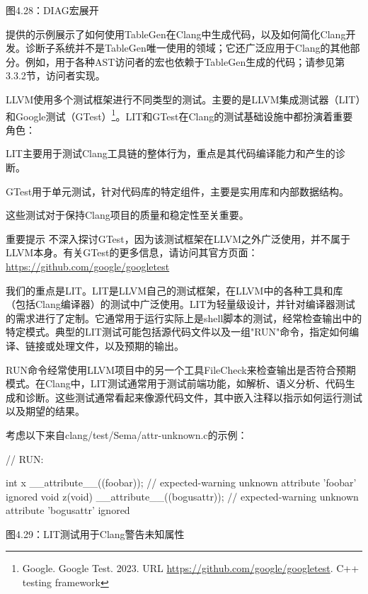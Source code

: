 \begin{center}
图4.28：DIAG宏展开
\end{center}

提供的示例展示了如何使用TableGen在Clang中生成代码，以及如何简化Clang开发。诊断子系统并不是TableGen唯一使用的领域；它还广泛应用于Clang的其他部分。例如，用于各种AST访问者的宏也依赖于TableGen生成的代码；请参见第3.3.2节，访问者实现。


LLVM使用多个测试框架进行不同类型的测试。主要的是LLVM集成测试器（LIT）和Google测试（GTest）\footnote{Google. Google Test. 2023. URL \url{https://github.com/google/googletest}. C++ testing framework}。LIT和GTest在Clang的测试基础设施中都扮演着重要角色：

LIT主要用于测试Clang工具链的整体行为，重点是其代码编译能力和产生的诊断。

GTest用于单元测试，针对代码库的特定组件，主要是实用库和内部数据结构。

这些测试对于保持Clang项目的质量和稳定性至关重要。

\begin{myNotic}{重要提示}
不深入探讨GTest，因为该测试框架在LLVM之外广泛使用，并不属于LLVM本身。有关GTest的更多信息，请访问其官方页面：\url{https://github.com/google/googletest}
\end{myNotic}

我们的重点是LIT。LIT是LLVM自己的测试框架，在LLVM中的各种工具和库（包括Clang编译器）的测试中广泛使用。LIT为轻量级设计，并针对编译器测试的需求进行了定制。它通常用于运行实际上是shell脚本的测试，经常检查输出中的特定模式。典型的LIT测试可能包括源代码文件以及一组"RUN"命令，指定如何编译、链接或处理文件，以及预期的输出。

RUN命令经常使用LLVM项目中的另一个工具FileCheck来检查输出是否符合预期模式。在Clang中，LIT测试通常用于测试前端功能，如解析、语义分析、代码生成和诊断。这些测试通常看起来像源代码文件，其中嵌入注释以指示如何运行测试以及期望的结果。

考虑以下来自clang/test/Sema/attr-unknown.c的示例：

\begin{cpp}
// RUN: %

int x __attribute__((foobar)); // expected-warning {{unknown attribute 'foobar' ignored}}
void z(void) __attribute__((bogusattr)); // expected-warning {{unknown attribute 'bogusattr' ignored}}
\end{cpp}

\begin{center}
图4.29：LIT测试用于Clang警告未知属性
\end{center}


